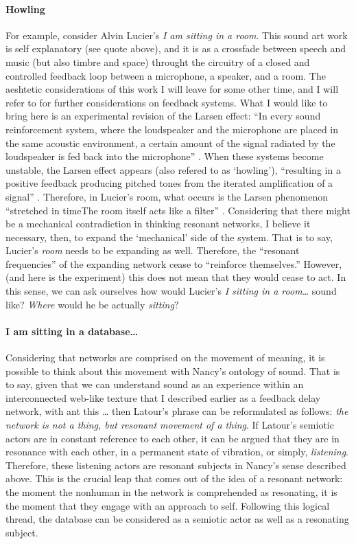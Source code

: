 \paragraph{Howling}
For example, consider Alvin Lucier's \textit{I am sitting in a room}. This sound art work is self explanatory (see quote above), and it is as a crossfade between speech and music (but also timbre and space) throught the circuitry of a closed and controlled feedback loop between a microphone, a speaker, and a room. The aeshtetic considerations of this work I will leave for some other time, and I will refer to \textcite{icmc/bbp2372.2012.006} for further considerations on feedback systems. What I would like to bring here is an experimental revision of the Larsen effect: ``In every sound reinforcement system, where the loudspeaker and the microphone are placed in the same acoustic environment, a certain amount of the signal radiated by the loudspeaker is fed back into the microphone'' \parencite[11]{Kro11:Aco}. When these systems become unstable, the Larsen effect appears (also refered to as `howling'), ``resulting in a positive feedback producing pitched tones from the iterated amplification of a signal'' \parencite[31]{icmc/bbp2372.2012.006}. Therefore, in Lucier's room, what occurs is the Larsen phenomenon ``stretched in time\doots The room itself acts like a filter'' \parencite[34]{icmc/bbp2372.2012.006}. Considering that there might be a mechanical contradiction in thinking resonant networks, I believe it necessary, then, to expand the `mechanical' side of the system. That is to say, Lucier's \textit{room} needs to be expanding as well. Therefore, the ``resonant frequencies'' of the expanding network cease to ``reinforce themselves.'' However, (and here is the experiment) this does not mean that they would cease to act. In this sense, we can ask ourselves how would Lucier's \textit{I sitting in a room\dots} sound like? \textit{Where} would he be actually \textit{sitting}?

\paragraph{I am sitting in a database\dots}
Considering that networks are comprised on the movement of meaning, it is possible to think about this movement with Nancy's ontology of sound. That is to say, given that we can understand sound as an experience within an interconnected web-like texture that I described earlier as a feedback delay network, with \gls{ant} this 
\dots
then Latour's phrase can be reformulated as follows: \textit{the network is not a thing, but resonant movement of a thing}. If Latour's semiotic actors are in constant reference to each other, it can be argued that they are in resonance with each other, in a permanent state of vibration, or simply, \textit{listening}. Therefore, these listening actors are resonant subjects in Nancy's sense described above. This is the crucial leap that comes out of the idea of a resonant network: the moment the nonhuman in the network is comprehended as resonating, it is the moment that they engage with an approach to self. Following this logical thread, the database can be considered as a semiotic actor as well as a resonating subject. 




